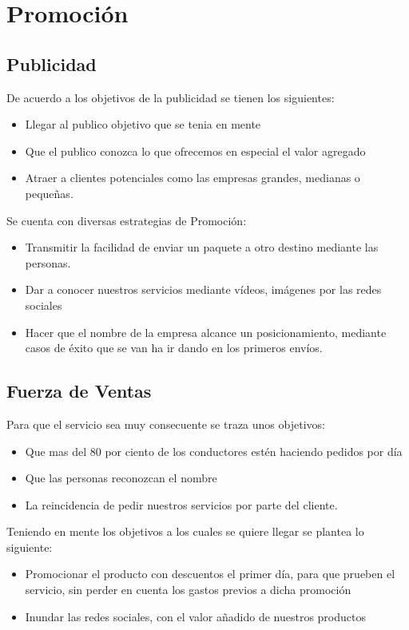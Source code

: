 \section{Promoción}
\subsection{Publicidad}
De acuerdo a los objetivos de la publicidad se tienen los siguientes:
\begin{itemize}
\item Llegar al publico objetivo que se tenia en mente 
\item Que el publico conozca lo que ofrecemos en especial el valor agregado
\item Atraer a clientes potenciales como las empresas grandes, medianas o pequeñas.
\end{itemize}
Se cuenta con diversas estrategias de Promoción:
\begin{itemize}
\item Transmitir la facilidad de enviar un paquete a otro destino mediante las personas.
\item Dar a conocer nuestros servicios mediante vídeos, imágenes por las redes sociales
\item Hacer que el nombre de la empresa alcance un posicionamiento, mediante casos de éxito que se van ha ir dando en los primeros envíos.

\end{itemize}
\subsection{Fuerza de Ventas}
Para que el servicio sea muy consecuente se traza unos objetivos:
\begin{itemize}
\item Que mas del 80 por ciento de los conductores estén haciendo pedidos por día 
\item Que las personas reconozcan el nombre 
\item La reincidencia de pedir nuestros servicios por parte del cliente.
\end{itemize}
Teniendo en mente los objetivos a los cuales se quiere llegar se plantea lo siguiente:
\begin{itemize}
\item Promocionar el producto con descuentos el primer día, para que prueben el servicio, sin perder en cuenta los gastos previos a dicha promoción
\item Inundar las redes sociales, con el valor añadido de nuestros productos
\end{itemize}
